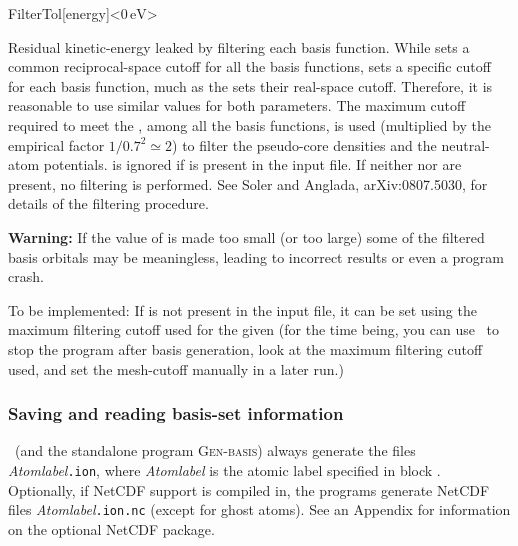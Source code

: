 \begin{fdfentry}{FilterTol}[energy]<$0\,\mathrm{eV}$>

  Residual kinetic-energy leaked by filtering each basis function.
  While  sets a common reciprocal-space cutoff
  for all the basis functions,  sets a specific
  cutoff for each basis function, much as the 
  sets their real-space cutoff. Therefore, it is reasonable to use
  similar values for both parameters.  The maximum cutoff required to
  meet the , among all the basis functions, is used
  (multiplied by the empirical factor $1/0.7^2 \simeq 2$) to filter
  the pseudo-core densities and the neutral-atom
  potentials.  is ignored if 
  is present in the input file.  If neither  nor
   are present, no filtering is performed.  See
  Soler and Anglada, arXiv:0807.5030, for details of the filtering
  procedure.

  \textbf{Warning:} If the value of  is made too
  small (or  too large) some of the filtered basis
  orbitals may be meaningless, leading to incorrect results or even a
  program crash.

  To be implemented: If  is not present in the
  input file, it can be set using the maximum filtering cutoff used
  for the given  (for the time being, you can use
   \fdftrue\ to stop the program after basis generation,
  look at the maximum filtering cutoff used, and set the mesh-cutoff
  manually in a later run.)

\end{fdfentry}



\subsubsection{Saving and reading basis-set information}

\siesta\ (and the standalone program \textsc{Gen-basis})
always generate the files
\textit{Atomlabel}\texttt{.ion}, where \textit{Atomlabel} is the atomic label
specified in block .  Optionally, if
NetCDF support is compiled in, the programs generate
NetCDF files 
\textit{Atomlabel}\texttt{.ion.nc} (except for ghost atoms).
See an Appendix for information on the optional NetCDF package.


